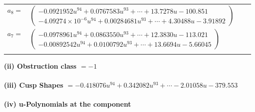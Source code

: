 \documentclass[1p]{elsarticle_modified}
\theoremstyle{definition}
\begin{document}
\begin{tabular}{m{7pt} m{180pt} m{7pt} m{180pt} }
\flushright $a_{8}=$&$\begin{pmatrix}-0.0921952 u^{94}+0.0767583 u^{93}+\cdots+13.7278 u-100.851\\-4.09274\times10^{-6} u^{94}+0.00284681 u^{93}+\cdots+4.30488 u-3.91892\end{pmatrix}$ \\
\flushright $a_{7}=$&$\begin{pmatrix}-0.0978961 u^{94}+0.0863550 u^{93}+\cdots+12.3830 u-113.021\\-0.00892542 u^{94}+0.0100792 u^{93}+\cdots+13.6694 u-5.66045\end{pmatrix}$\\&\end{tabular}
\flushleft \textbf{(ii) Obstruction class $= -1$}\\~\\
\flushleft \textbf{(iii) Cusp Shapes $= -0.418076 u^{94}+0.342082 u^{93}+\cdots-2.01058 u-379.553$}\\~\\
\newpage\renewcommand{\arraystretch}{1}
\flushleft \textbf{(iv) u-Polynomials at the component}\newline \\
\end{document}
